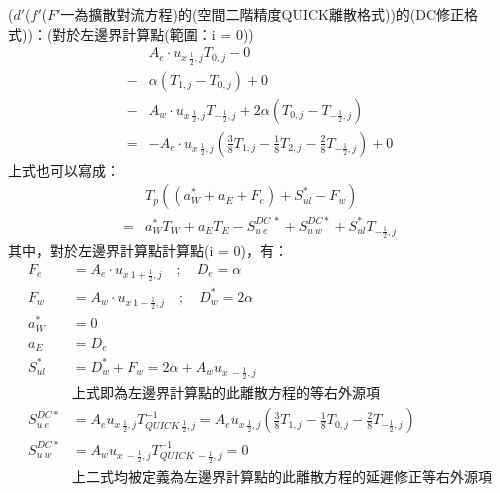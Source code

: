 \documentclass[12pt]{article}
\begin{document}
\noindent ($d'$($f'$($F'$一為擴散對流方程)的(空間二階精度QUICK離散格式))的(DC修正格式))：(對於左邊界計算點(範圍：i = 0))\\
\begin{equation}
\begin{split}
    &A_{e}\cdot u_{x\ \frac{1}{2},j}T_{0,j} - 0  \\
    -&\alpha(T_{1,j}-T_{0,j}) + 0  \\
    -&A_{w}\cdot u_{x\ \frac{1}{2},j}T_{-\frac{1}{2},j}+ 2\alpha(T_{0,j} - T_{-\frac{1}{2},j})\\
    =& - A_{e}\cdot u_{x\ \frac{1}{2},j}(\frac{3}{8}T_{1,j} -\frac{1}{8}T_{2,j} - \frac{2}{8}T_{-\frac{1}{2},j}) + 0 
\end{split}
\end{equation}
\noindent 上式也可以寫成：\\
\begin{equation}
\begin{split}
    &T_{p}((a_{W}^{*}+a_{E}+F_{e})+S_{ul}^{*} - F_{w})\\
    =& a_{W}^{*}T_{W} + a_{E}T_{E} - S_{u\ e}^{DC\ *} + S_{u\ w}^{DC *}+ S_{ul}^{*}T_{-\frac{1}{2},j}
\end{split}
\end{equation}
\noindent 其中，對於左邊界計算點計算點(i = 0)，有：\\
\begin{equation}
\begin{split}
    F_{e} &= A_{e}\cdot u_{x\ 1+\frac{1}{2},j} \quad;\quad D_{e} = \alpha\\
    F_{w} &= A_{w}\cdot u_{x\ 1-\frac{1}{2},j} \quad;\quad D_{w}^{*} = 2\alpha \\
    a_{W}^{*} &= 0\\
    a_{E} &= D_{e}\\
    S_{ul}^{*} &= D_{w}^{*} + F_{w} = 2\alpha + A_{w}u_{x\ -\frac{1}{2},j}\\
    &\mbox{上式即為左邊界計算點的此離散方程的等右外源項}\\
    S_{u\ e}^{DC *} &=  A_{e}u_{x\ \frac{1}{2},j}T_{QUICK\ \frac{1}{2},j}^{-1} = A_{e}u_{x\ \frac{1}{2},j}(\frac{3}{8}T_{1,j} - \frac{1}{8}T_{0,j} - \frac{2}{8}T_{-\frac{1}{2},j})\\
    S_{u\ w}^{DC *} &=  A_{w}u_{x\ -\frac{1}{2},j}T_{QUICK\ -\frac{1}{2},j}^{-1} = 0 \\
    &\mbox{上二式均被定義為左邊界計算點的此離散方程的延遲修正等右外源項}\\
\end{split}
\end{equation} 
\end{document}
